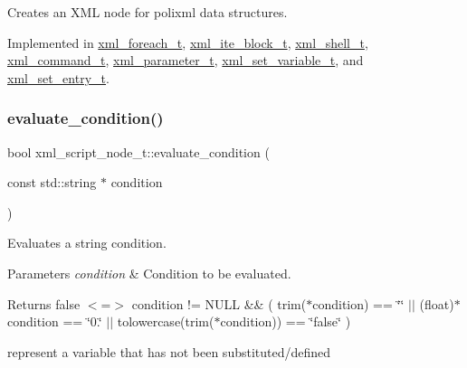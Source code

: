 Creates an X\+ML node for polixml data structures. 



Implemented in \hyperlink{structxml__foreach__t_a6056d8114277e5aad52bf31408bd24a2}{xml\+\_\+foreach\+\_\+t}, \hyperlink{classxml__ite__block__t_a1b9744c412acd0ded712ab4c8956ce27}{xml\+\_\+ite\+\_\+block\+\_\+t}, \hyperlink{classxml__shell__t_a8e65fb9948e3fdc63e370de8c67cfefc}{xml\+\_\+shell\+\_\+t}, \hyperlink{classxml__command__t_a8b11fb3c538442d1717e06a8f448b9ee}{xml\+\_\+command\+\_\+t}, \hyperlink{classxml__parameter__t_aa08b7e9ca07a2cc859a40a280b31f133}{xml\+\_\+parameter\+\_\+t}, \hyperlink{classxml__set__variable__t_a95b663fe068ba84695f348fb6cea929b}{xml\+\_\+set\+\_\+variable\+\_\+t}, and \hyperlink{classxml__set__entry__t_ac1b86d13e93d6fb01ace81a603cede2a}{xml\+\_\+set\+\_\+entry\+\_\+t}.

\mbox{\label{classxml__script__node__t_a01f5c0deca615d53775e40a512be3226}} 
\subsubsection{\texorpdfstring{evaluate\+\_\+condition()}{evaluate\_condition()}\hspace{0.1cm}{\footnotesize\ttfamily [1/2]}}
{\footnotesize\ttfamily bool xml\+\_\+script\+\_\+node\+\_\+t\+::evaluate\+\_\+condition (\begin{DoxyParamCaption}\item[{const std\+::string $\ast$}]{condition }\end{DoxyParamCaption})\hspace{0.3cm}{\ttfamily [static]}}



Evaluates a string condition. 


\begin{DoxyParams}{Parameters}
{\em condition} & Condition to be evaluated. \\
\hline
\end{DoxyParams}
\begin{DoxyReturn}{Returns}
false $<$=$>$ condition != N\+U\+LL \&\& ( trim($\ast$condition) == \char`\"{}\char`\"{} $\vert$$\vert$ (float)$\ast$condition == \char`\"{}0.\char`\"{} $\vert$$\vert$ tolowercase(trim($\ast$condition)) == \char`\"{}false\char`\"{} ) 
\end{DoxyReturn}
represent a variable that has not been substituted/defined 

